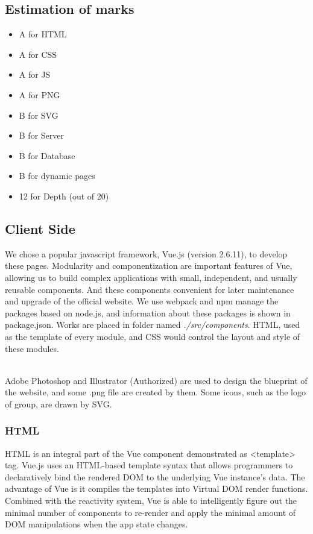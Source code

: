 \documentclass{article}
\begin{document}
\subsection{Estimation of marks}
\begin{itemize}
    \item A for HTML
    \item A for CSS
    \item A for JS
    \item A for PNG
    \item B for SVG
    \item B for Server
    \item B for Database
    \item B for dynamic pages
    \item 12 for Depth (out of 20)
\end{itemize} 

\subsection{Client Side}
We chose a popular javascript framework, Vue.js (version 2.6.11), to 
develop these pages.
Modularity and componentization are important features of Vue,  
allowing us to build complex applications with small, independent, 
and usually reusable components. And these components convenient 
for later maintenance and upgrade of the official website. 
We use webpack and npm manage the packages based on node.js, and 
information about these packages is shown in package.json. Works are 
placed in folder named \textit{./src/components}. HTML, used as 
the template of every module, and CSS would control the layout 
and style of these modules.

~\\
\noindent
Adobe Photoshop and Illustrator (Authorized) are used to design the 
blueprint of the website, and some .png file are created by them. 
Some icons, such as the logo of group, are drawn by SVG.

\subsubsection{HTML}
HTML is an integral part of the Vue component demonstrated as \textless template\textgreater \space
tag. 
Vue.js uses an HTML-based template syntax that allows programmers to declaratively 
bind the rendered DOM to the underlying Vue instance’s data. The advantage of Vue 
is it compiles the templates into Virtual DOM render functions. Combined with the 
reactivity system, Vue is able to intelligently figure out the minimal number of 
components to re-render and apply the minimal amount of DOM manipulations when the 
app state changes.
\end{document}
